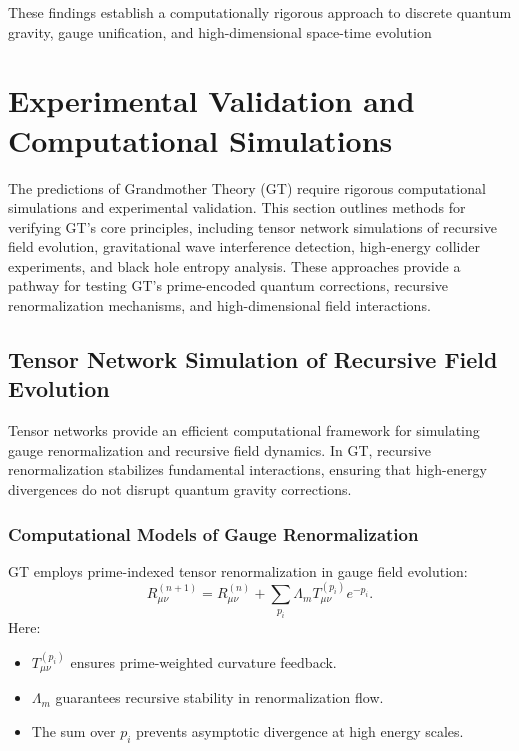 \documentclass{article}
\theoremstyle{plain}
\begin{document}
These findings establish a computationally rigorous approach to discrete quantum gravity, gauge unification, and high-dimensional space-time evolution

\section{Experimental Validation and Computational Simulations}

The predictions of Grandmother Theory (GT) require rigorous computational simulations and experimental validation. This section outlines methods for verifying GT’s core principles, including tensor network simulations of recursive field evolution, gravitational wave interference detection, high-energy collider experiments, and black hole entropy analysis. These approaches provide a pathway for testing GT’s prime-encoded quantum corrections, recursive renormalization mechanisms, and high-dimensional field interactions.

\subsection{Tensor Network Simulation of Recursive Field Evolution}
Tensor networks provide an efficient computational framework for simulating gauge renormalization and recursive field dynamics. In GT, recursive renormalization stabilizes fundamental interactions, ensuring that high-energy divergences do not disrupt quantum gravity corrections.

\subsubsection{Computational Models of Gauge Renormalization}
GT employs prime-indexed tensor renormalization in gauge field evolution:
\begin{equation}
    R_{\mu\nu}^{(n+1)} = R_{\mu\nu}^{(n)} + \sum_{p_i} \Lambda_m T_{\mu\nu}^{(p_i)} e^{-p_i}.
\end{equation}
Here:
\begin{itemize}
    \item $T_{\mu\nu}^{(p_i)}$ ensures prime-weighted curvature feedback.
    \item $\Lambda_m$ guarantees recursive stability in renormalization flow.
    \item The sum over $p_i$ prevents asymptotic divergence at high energy scales.
\end{itemize}
\end{document}
